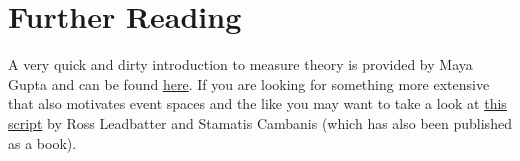 \section*{Further Reading}
A very quick and dirty introduction to measure theory is provided by Maya Gupta and can be found 
\href{https://www.ee.washington.edu/techsite/papers/documents/UWEETR-2006-0008.pdf}{here}. If you are
looking for something more extensive that also motivates event spaces and the like you may want to 
take a look at \href{http://www.stat.ncsu.edu/people/fuentes/courses/st778/lectures/ross}{this script}
by Ross Leadbatter and Stamatis Cambanis (which has also been
published as a book).




